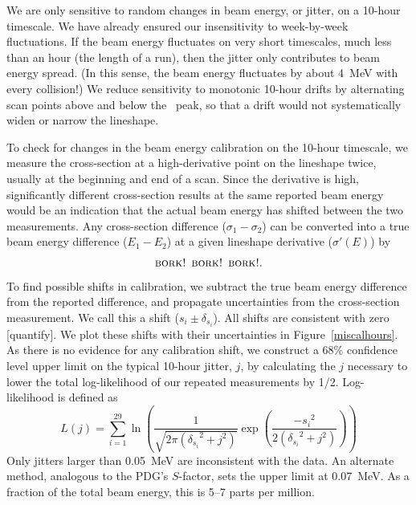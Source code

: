 \documentclass{cornell}
\begin{document}
We are only sensitive to random changes in beam energy, or jitter, on
a 10-hour timescale.  We have already ensured our insensitivity
to week-by-week fluctuations.  If the beam energy fluctuates on very
short timescales, much less than an hour (the length of a run), then
the jitter only contributes to beam energy spread.  (In this
sense, the beam energy fluctuates by about 4~MeV with every
collision!)  We reduce sensitivity to monotonic 10-hour drifts by
alternating scan points above and below the \ups\ peak, so that a
drift would not systematically widen or narrow the lineshape.

To check for changes in the beam energy calibration on the
10-hour timescale, we measure the cross-section at a high-derivative
point on the lineshape twice, usually at the beginning and end of a
scan.  Since the derivative is high, significantly different
cross-section results at the same reported beam energy would be an
indication that the actual beam energy has shifted between the two
measurements.  Any cross-section difference ($\sigma_1-\sigma_2$) can
be converted into a true beam energy difference ($E_1-E_2$) at a given
lineshape derivative ($\sigma'(E)$) by
\begin{equation}
  \mbox{\sc bork! bork! bork!} \mbox{.}
\end{equation}
To find possible shifts in calibration, we subtract the true beam
energy difference from the reported difference, and propagate
uncertainties from the cross-section measurement.  We call this a
shift ($s_i \pm \delta_{s_i}$).  All shifts are consistent with zero
[quantify].  We plot these shifts with their uncertainties in
Figure~\ref{miscalhours}.  As there is no evidence for any calibration
shift, we construct a 68\% confidence level upper limit on the typical
10-hour jitter, $j$, by calculating the $j$ necessary to lower the
total log-likelihood of our repeated measurements by 1/2.
Log-likelihood is defined as
\begin{equation}
  L(j) = \sum_{i=1}^{29} \ln \left(
  \frac{1}{\sqrt{2\pi({\delta_{s_i}}^2 + j^2)}} \exp\left(\frac{-{s_i}^2}{2
  ({\delta_{s_i}}^2 + j^2)} \right) \right)
\end{equation}
Only jitters larger than 0.05~MeV are inconsistent with the data.  An
alternate method, analogous to the PDG's $S$-factor, sets the upper
limit at 0.07~MeV.  As a fraction of the total beam energy, this is
5--7 parts per million.
\end{document}
